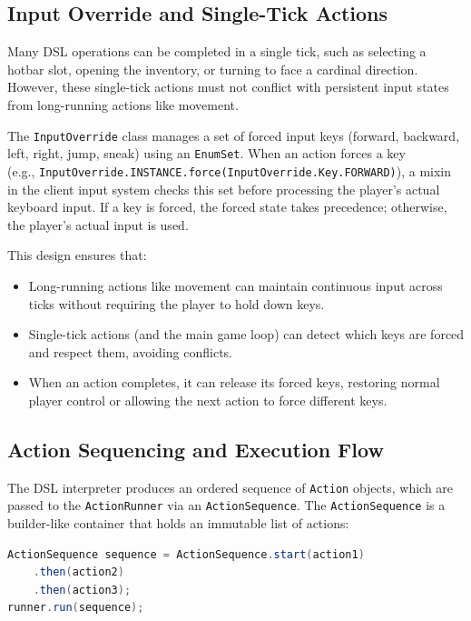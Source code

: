 \subsection{Input Override and Single-Tick Actions}

Many DSL operations can be completed in a single tick, such as selecting a hotbar slot, opening the inventory, or turning to face a cardinal direction.
However, these single-tick actions must not conflict with persistent input states from long-running actions like movement.

The \texttt{InputOverride} class manages a set of forced input keys (forward, backward, left, right, jump, sneak) using an \texttt{EnumSet}.
When an action forces a key \\ (e.g., \texttt{InputOverride.INSTANCE.force(InputOverride.Key.FORWARD)}), a mixin in the client input system checks this set before processing the player's actual keyboard input.
If a key is forced, the forced state takes precedence; otherwise, the player's actual input is used.

This design ensures that:
\begin{itemize}
\item[--] Long-running actions like movement can maintain continuous input across ticks without requiring the player to hold down keys.
\item[--] Single-tick actions (and the main game loop) can detect which keys are forced and respect them, avoiding conflicts.
\item[--] When an action completes, it can release its forced keys, restoring normal player control or allowing the next action to force different keys.
\end{itemize}

\subsection{Action Sequencing and Execution Flow}

The DSL interpreter produces an ordered sequence of \texttt{Action} objects, which are passed to the \texttt{ActionRunner} via an \texttt{ActionSequence}.
The \texttt{ActionSequence} is a builder-like container that holds an immutable list of actions:

\begin{lstlisting}[language=Java]
ActionSequence sequence = ActionSequence.start(action1)
    .then(action2)
    .then(action3);
runner.run(sequence);
\end{lstlisting}


